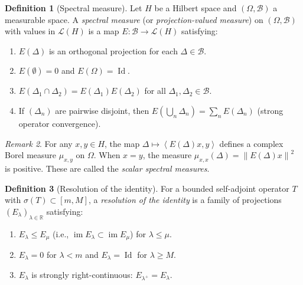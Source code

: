 \documentclass[a4paper,12pt]{book}
\DeclareMathOperator{\im}{im}
\DeclareMathOperator{\Id}{Id}
\newcommand{\R}{\mathbb{R}}
\newcommand{\norm}[1]{\left\| #1 \right\|}
\newcommand{\inner}[2]{\left\langle #1, #2 \right\rangle}
\theoremstyle{definition}
\newtheorem{definition}{Definition}[chapter]
\theoremstyle{plain}
\theoremstyle{remark}
\newtheorem{remark}[definition]{Remark}
\begin{document}
\begin{definition}[Spectral measure]\label{def:spectral-measure}
Let $H$ be a Hilbert space and $(\Omega, \mathcal{B})$ a measurable space. A
\emph{spectral measure} (or \emph{projection-valued measure}) on $(\Omega, \mathcal{B})$
with values in $\mathcal{L}(H)$ is a map
$E \colon \mathcal{B} \to \mathcal{L}(H)$ satisfying:
\begin{enumerate}[label=(\roman*)]
  \item $E(\Delta)$ is an orthogonal projection for each $\Delta \in \mathcal{B}$.
  \item $E(\emptyset) = 0$ and $E(\Omega) = \Id$.
  \item $E(\Delta_1 \cap \Delta_2) = E(\Delta_1) E(\Delta_2)$ for all
        $\Delta_1, \Delta_2 \in \mathcal{B}$.
  \item If $(\Delta_n)$ are pairwise disjoint, then
        $E(\bigcup_n \Delta_n) = \sum_n E(\Delta_n)$ (strong operator convergence).
\end{enumerate}
\end{definition}

\begin{remark}\label{rem:scalar-measure}
For any $x, y \in H$, the map $\Delta \mapsto \inner{E(\Delta)x}{y}$ defines a
complex Borel measure $\mu_{x,y}$ on $\Omega$. When $x = y$, the measure
$\mu_{x,x}(\Delta) = \norm{E(\Delta)x}^2$ is positive. These are called the
\emph{scalar spectral measures}.
\end{remark}

\begin{definition}[Resolution of the identity]\label{def:resolution-identity}
For a bounded self-adjoint operator $T$ with $\sigma(T) \subset [m, M]$, a
\emph{resolution of the identity} is a family of projections $(E_\lambda)_{\lambda \in \R}$
satisfying:
\begin{enumerate}[label=(\roman*)]
  \item $E_\lambda \le E_\mu$ (i.e., $\im E_\lambda \subset \im E_\mu$)
        for $\lambda \le \mu$.
  \item $E_\lambda = 0$ for $\lambda < m$ and $E_\lambda = \Id$ for $\lambda \ge M$.
  \item $E_\lambda$ is strongly right-continuous:
        $E_{\lambda^+} = E_\lambda$.
\end{enumerate}
\end{definition}
\end{document}
